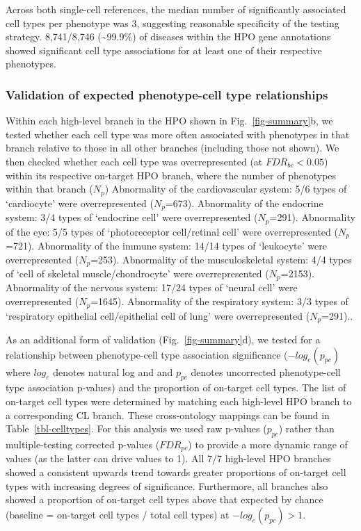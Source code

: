 \documentclass[
]{agujournal2019}
\begin{document}
Across both single-cell references, the median number of significantly
associated cell types per phenotype was 3, suggesting reasonable
specificity of the testing strategy. 8,741/8,746 (\textasciitilde99.9\%)
of diseases within the HPO gene annotations showed significant cell type
associations for at least one of their respective phenotypes.

\subsubsection{Validation of expected phenotype-cell type
relationships}\label{validation-of-expected-phenotype-cell-type-relationships}

Within each high-level branch in the HPO shown in
Fig.~\ref{fig-summary}b, we tested whether each cell type was more often
associated with phenotypes in that branch relative to those in all other
branches (including those not shown). We then checked whether each cell
type was overrepresented (at \(FDR_{bc}<0.05\)) within its respective
on-target HPO branch, where the number of phenotypes within that branch
(\(N_{p}\)) Abnormality of the cardiovascular system: 5/6 types of
`cardiocyte' were overrepresented (\(N_{p}\)=673). Abnormality of the
endocrine system: 3/4 types of `endocrine cell' were overrepresented
(\(N_{p}\)=291). Abnormality of the eye: 5/5 types of `photoreceptor
cell/retinal cell' were overrepresented (\(N_{p}\)=721). Abnormality of
the immune system: 14/14 types of `leukocyte' were overrepresented
(\(N_{p}\)=253). Abnormality of the musculoskeletal system: 4/4 types of
`cell of skeletal muscle/chondrocyte' were overrepresented
(\(N_{p}\)=2153). Abnormality of the nervous system: 17/24 types of
`neural cell' were overrepresented (\(N_{p}\)=1645). Abnormality of the
respiratory system: 3/3 types of `respiratory epithelial cell/epithelial
cell of lung' were overrepresented (\(N_{p}\)=291)..

As an additional form of validation (Fig.~\ref{fig-summary}d), we tested
for a relationship between phenotype-cell type association significance
(\(-log_{e}(p_{pc})\) where \(log_{e}\) denotes natural log and and
\(p_{pc}\) denotes uncorrected phenotype-cell type association p-values)
and the proportion of on-target cell types. The list of on-target cell
types were determined by matching each high-level HPO branch to a
corresponding CL branch. These cross-ontology mappings can be found in
Table~\ref{tbl-celltypes}. For this analysis we used raw p-values
(\(p_{pc}\)) rather than multiple-testing corrected p-values
(\(FDR_{pc}\)) to provide a more dynamic range of values (as the latter
can drive values to 1). All 7/7 high-level HPO branches showed a
consistent upwards trend towards greater proportions of on-target cell
types with increasing degrees of significance. Furthermore, all branches
also showed a proportion of on-target cell types above that expected by
chance (baseline = on-target cell types / total cell types) at
\(-log_{e}(p_{pc})>1\).
\end{document}
